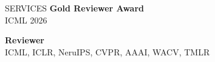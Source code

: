 \documentclass{resume} %
\begin{document}
\begin{rSection}{SERVICES}
\textbf{Gold Reviewer Award}\\
ICML 2026

\textbf{Reviewer}\\
ICML, ICLR, NeruIPS, CVPR, AAAI, WACV, TMLR


 


\end{rSection}
\end{document}
